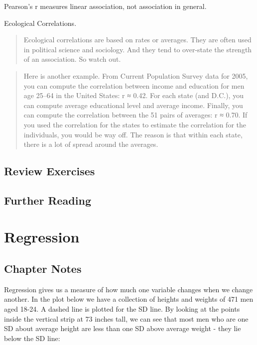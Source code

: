 \documentclass[
]{book}
\begin{document}
Pearson's r measures linear association, not association in general.

Ecological Correlations.

\begin{quote}
Ecological correlations are based on rates or averages. They are often used in political science and sociology. And they tend to over-state the strength of an association. So watch out.
\end{quote}

\begin{quote}
Here is another example. From Current Population Survey data for 2005, you can compute the correlation between income and education for men age 25--64 in the United States: r ≈ 0.42. For each state (and D.C.), you can compute average educational level and average income. Finally, you can compute the correlation between the 51 pairs of averages: r ≈ 0.70. If you used the correlation for the states to estimate the correlation for the individuals, you would be way off. The reason is that within each state, there is a lot of spread around the averages.
\end{quote}

\hypertarget{review-exercises-7}{%
\section{Review Exercises}\label{review-exercises-7}}

\hypertarget{further-reading-8}{%
\section*{Further Reading}\label{further-reading-8}}

\hypertarget{regression}{%
\chapter{Regression}\label{regression}}

\hypertarget{chapter-notes-9}{%
\section{Chapter Notes}\label{chapter-notes-9}}

Regression gives us a measure of how much one variable changes when we change another. In the plot below we have a collection of heights and weights of 471 men aged 18-24. A dashed line is plotted for the SD line. By looking at the points inside the vertical strip at 73 inches tall, we can see that most men who are one SD about average height are less than one SD above average weight - they lie below the SD line:
\end{document}
